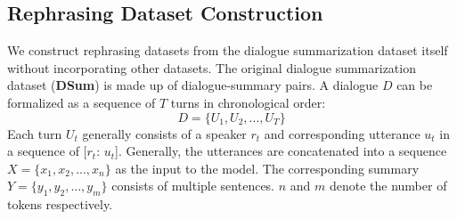 %

\subsection{Rephrasing Dataset Construction}
\label{sec:rephrasedata}
We construct rephrasing datasets from the dialogue summarization dataset itself without incorporating other datasets. 
The original dialogue summarization dataset (\textbf{DSum}) is made up of dialogue-summary pairs. 
A dialogue $D$ can be formalized as a sequence of $T$ turns in chronological order:
\begin{equation}
	D = \{U_1, U_2, ..., U_T\}
\end{equation}
Each turn $U_t$ generally consists of a speaker $r_t$ and corresponding utterance $u_t$ in a sequence of [$r_t$: $u_t$]. Generally, the utterances are concatenated into a sequence $X=\{x_1, x_2, ..., x_n\}$ as the input to the model. The corresponding summary $Y=\{y_1, y_2, ..., y_m\}$ consists of multiple sentences. $n$ and $m$ denote the number of tokens respectively.


